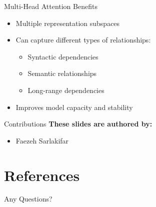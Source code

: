 \documentclass[serif, aspectratio=169]{beamer}
\begin{document}
\begin{frame}{Multi-Head Attention Benefits}
    \begin{itemize}
        \item Multiple representation subspaces
        \item Can capture different types of relationships:
        \begin{itemize}
            \item Syntactic dependencies
            \item Semantic relationships
            \item Long-range dependencies
        \end{itemize}
        \item Improves model capacity and stability
    \end{itemize}
\end{frame}

\begin{frame}{Contributions}
	\textbf{These slides are authored by:}
	\begin{itemize}
		\item Faezeh Sarlakifar
	\end{itemize}
	
\end{frame}


\section{References}

\begin{frame}[allowframebreaks]
    
    
    \nocite{*} %
\end{frame}


\begin{frame}
    \begin{center}
        {\Huge Any Questions?}
    \end{center}
\end{frame}
\end{document}
